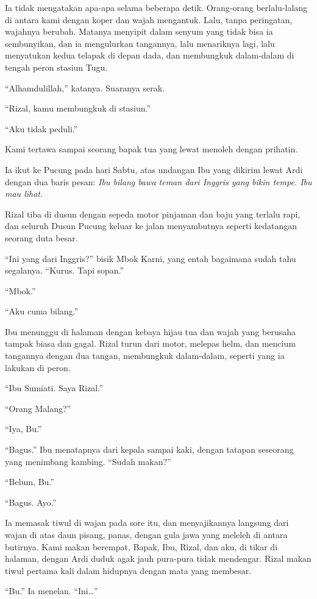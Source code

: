 \documentclass[11pt,twoside,openany]{book}
\makeatletter
\newcommand{\scenebreak}{\par\vspace{0.9em}{\centering\textsc{*\hspace{0.7em}*\hspace{0.7em}*}\par}\vspace{0.9em}\@afterindentfalse\@afterheading}
\makeatother
\begin{document}
Ia tidak mengatakan apa-apa selama beberapa detik. Orang-orang berlalu-lalang di antara kami dengan koper dan wajah mengantuk. Lalu, tanpa peringatan, wajahnya berubah. Matanya menyipit dalam senyum yang tidak bisa ia sembunyikan, dan ia mengulurkan tangannya, lalu menariknya lagi, lalu menyatukan kedua telapak di depan dada, dan membungkuk dalam-dalam di tengah peron stasiun Tugu.

``Alhamdulillah,'' katanya. Suaranya serak.

``Rizal, kamu membungkuk di stasiun.''

``Aku tidak peduli.''

Kami tertawa sampai seorang bapak tua yang lewat menoleh dengan prihatin.

\scenebreak
Ia ikut ke Pucung pada hari Sabtu, atas undangan Ibu yang dikirim lewat Ardi dengan dua baris pesan: \emph{Ibu bilang bawa teman dari Inggris yang bikin tempe. Ibu mau lihat.}

Rizal tiba di dusun dengan sepeda motor pinjaman dan baju yang terlalu rapi, dan seluruh Dusun Pucung keluar ke jalan menyambutnya seperti kedatangan seorang duta besar.

``Ini yang dari Inggris?'' bisik Mbok Karni, yang entah bagaimana sudah tahu segalanya. ``Kurus. Tapi sopan.''

``Mbok.''

``Aku cuma bilang.''

Ibu menunggu di halaman dengan kebaya hijau tua dan wajah yang berusaha tampak biasa dan gagal. Rizal turun dari motor, melepas helm, dan mencium tangannya dengan dua tangan, membungkuk dalam-dalam, seperti yang ia lakukan di peron.

``Ibu Sumiati. Saya Rizal.''

``Orang Malang?''

``Iya, Bu.''

``Bagus.'' Ibu menatapnya dari kepala sampai kaki, dengan tatapan seseorang yang menimbang kambing. ``Sudah makan?''

``Belum, Bu.''

``Bagus. Ayo.''

Ia memasak tiwul di wajan pada sore itu, dan menyajikannya langsung dari wajan di atas daun pisang, panas, dengan gula jawa yang meleleh di antara butirnya. Kami makan berempat, Bapak, Ibu, Rizal, dan aku, di tikar di halaman, dengan Ardi duduk agak jauh pura-pura tidak mendengar. Rizal makan tiwul pertama kali dalam hidupnya dengan mata yang membesar.

``Bu.'' Ia menelan. ``Ini\ldots{}''
\end{document}
